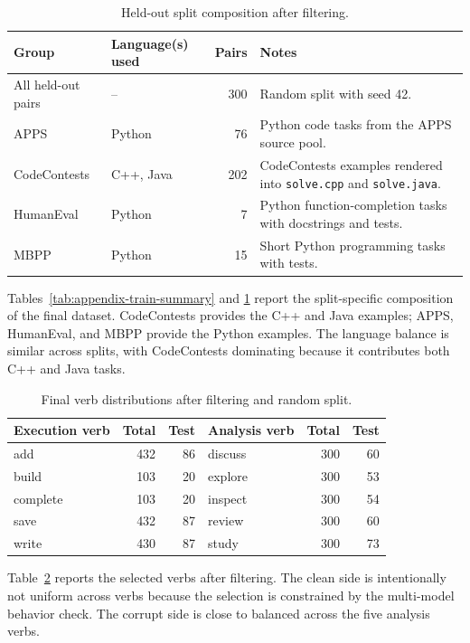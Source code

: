 \begin{table}[h]
\centering
\scriptsize
\caption{Held-out split composition after filtering.}
\label{tab:appendix-test-summary}
\begin{tabularx}{\linewidth}{llrX}
\toprule
Group & Language(s) used & Pairs & Notes \\
\midrule
All held-out pairs & -- & 300 & Random split with seed 42. \\
APPS & Python & 76 & Python code tasks from the APPS source pool. \\
CodeContests & C++, Java & 202 & CodeContests examples rendered into \texttt{solve.cpp} and \texttt{solve.java}. \\
HumanEval & Python & 7 & Python function-completion tasks with docstrings and tests. \\
MBPP & Python & 15 & Short Python programming tasks with tests. \\
\bottomrule
\end{tabularx}
\end{table}

Tables~\ref{tab:appendix-train-summary} and
\ref{tab:appendix-test-summary} report the split-specific composition of the
final dataset. CodeContests provides the C++ and Java examples; APPS,
HumanEval, and MBPP provide the Python examples. The language balance is
similar across splits, with CodeContests dominating because it contributes
both C++ and Java tasks.

\begin{table}[h]
\centering
\small
\caption{Final verb distributions after filtering and random split.}
\label{tab:appendix-verb-distribution}
\begin{tabularx}{\linewidth}{lrr|lrr}
\toprule
Execution verb & Total & Test & Analysis verb & Total & Test \\
\midrule
add & 432 & 86 & discuss & 300 & 60 \\
build & 103 & 20 & explore & 300 & 53 \\
complete & 103 & 20 & inspect & 300 & 54 \\
save & 432 & 87 & review & 300 & 60 \\
write & 430 & 87 & study & 300 & 73 \\
\bottomrule
\end{tabularx}
\end{table}

Table~\ref{tab:appendix-verb-distribution} reports the selected verbs after
filtering. The clean side is intentionally not uniform across verbs because
the selection is constrained by the multi-model behavior check. The corrupt
side is close to balanced across the five analysis verbs.

